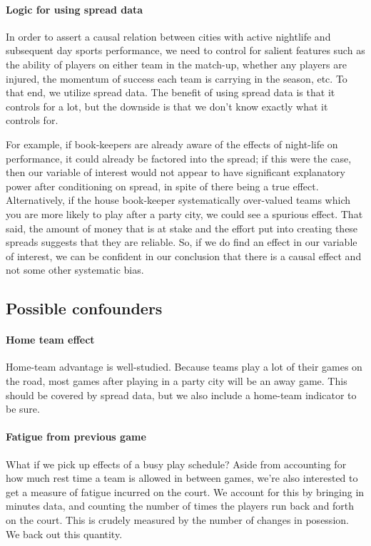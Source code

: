 \documentclass[letterpaper,12pt]{article}
\begin{document}
\paragraph{Logic for using spread data}
In order to assert a causal relation between cities with active nightlife 
and subsequent day sports performance, we need to control for salient
features such as the ability of players on either team in the match-up,
whether any players are injured, the momentum of success each team is carrying
in the season, etc.\cite{anderson} To that end, we utilize spread data. The benefit of
using spread data is that it controls for a lot, but the downside is that
we don't know exactly what it controls for.

For example, if book-keepers
are already aware of the effects of night-life on performance, it could
already be factored into the spread; if this were the case, then our variable
of interest would not appear to have significant explanatory power
after conditioning on spread, in spite of there being
a true effect. Alternatively,
if the house book-keeper systematically over-valued
teams which you are more likely to play after a party city,
we could see a spurious effect. 
That said, the amount of money that is at stake and the effort put into creating these spreads 
suggests that they are reliable. So, if we do find an effect in our variable of interest,
we can be confident in our conclusion that there is a causal effect and not some
other systematic bias.

\subsection{Possible confounders}

\paragraph{Home team effect}
Home-team advantage is well-studied.\cite{jones07, jones08}  
Because teams play a lot of their games on the road,
most games after playing in a party city will be an away game.
This should be covered by spread data, but we also include
a home-team indicator to be sure.

\paragraph{Fatigue from previous game}
What if we pick up effects of a busy play schedule?
Aside from accounting for how much rest time a team is allowed in between games,
we're also interested to get a measure of
fatigue incurred on the court.
We account for this by bringing in minutes data, and counting the number of 
times the players run back and forth on the court. This is crudely measured
by the number of changes in posession. We back out this quantity.
\end{document}
